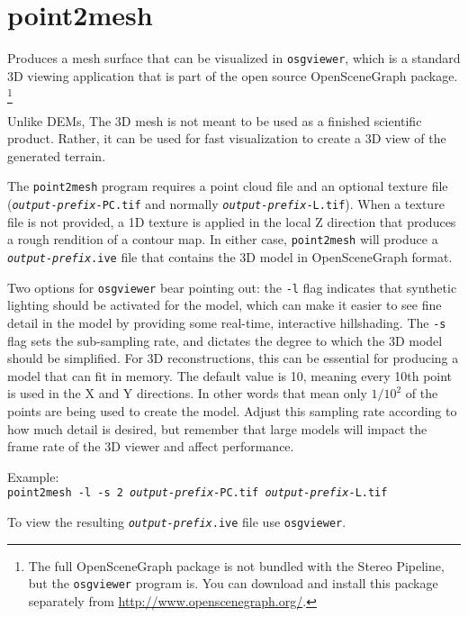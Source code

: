\section{point2mesh}
\label{point2mesh}

Produces a mesh surface that can be visualized in {\tt osgviewer},
which is a standard 3D viewing application that is part of the open
source OpenSceneGraph package.  \footnote{The full OpenSceneGraph package
is not bundled with the Stereo Pipeline, but the \texttt{osgviewer} program
is.  You can download and install this package separately from 
\url{http://www.openscenegraph.org/}.}

Unlike \acp{DEM}, The 3D mesh is not meant to be used as a finished
scientific product.  Rather, it can be used for fast visualization
to create a 3D view of the generated terrain.

The \texttt{point2mesh} program requires a point cloud file and an
optional texture file (\texttt{\textit{output-prefix}-PC.tif} and
normally \texttt{\textit{output-prefix}-L.tif}). When a texture
file is not provided, a 1D texture is applied in the local Z direction
that produces a rough rendition of a contour map.  In either case,
\texttt{point2mesh} will produce a \texttt{\textit{output-prefix}.ive}
file that contains the 3D model in OpenSceneGraph format.

Two options for \texttt{osgviewer} bear pointing out: the \texttt{-l}
flag indicates that synthetic lighting should be activated for the
model, which can make it easier to see fine detail in the model by
providing some real-time, interactive hillshading.  The \verb#-s#
flag sets the sub-sampling rate, and dictates the degree to which
the 3D model should be simplified.  For 3D reconstructions, this
can be essential for producing a model that can fit in memory.  The
default value is 10, meaning every 10th point is used in the X and
Y directions. In other words that mean only $1/10^2$ of the points
are being used to create the model. Adjust this sampling rate
according to how much detail is desired, but remember that large
models will impact the frame rate of the 3D viewer and affect
performance.

Example:\\
\hspace*{2em}\texttt{point2mesh -l -s 2 \textit{output-prefix}-PC.tif \textit{output-prefix}-L.tif}

To view the resulting \texttt{\textit{output-prefix}.ive} file use 
\texttt{osgviewer}.


